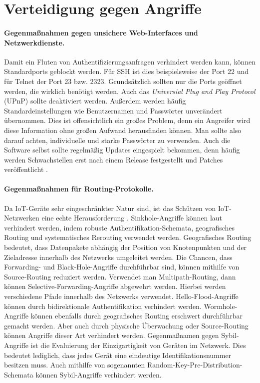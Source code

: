 \section{Verteidigung gegen Angriffe}

\paragraph{Gegenmaßnahmen gegen unsichere Web-Interfaces und Netzwerkdienste.}
Damit ein Fluten von Authentifizierungsanfragen verhindert werden kann, können
Standardports geblockt werden. Für SSH ist dies beispielsweise der Port 22 und
für Telnet der Port 23 bzw. 2323. Grundsätzlich sollten nur die Ports
geöffnet werden, die wirklich benötigt werden. Auch das \textit{Universial Plug
and Play Protocol} (UPnP) sollte deaktiviert werden. Außerdem werden häufig
Standardeinstellungen wie Benutzernamen und Passwörter unverändert übernommen.
Dies ist offensichtlich ein großes Problem, denn ein Angreifer wird diese
Information ohne großen Aufwand herausfinden können. Man sollte also darauf
achten, individuelle und starke Passwörter zu verwenden. Auch die Software
selbst sollte regelmäßig Updates eingespielt bekommen, denn häufig werden
Schwachstellen erst nach einem Release festgestellt und Patches
veröffentlicht \cite{paper}.

\paragraph{Gegenmaßnahmen für Routing-Protokolle.}
Da IoT-Geräte sehr eingeschränkter Natur sind, ist das Schützen von
IoT-Netzwerken eine echte Herausforderung \cite{patel2016}. Sinkhole-Angriffe
können laut \cite{paper} verhindert werden, indem robuste
Authentifikation-Schemata, geografisches Routing und systematisches Rerouting
verwendet werden.  Geografisches Routing bedeutet, dass Datenpakete abhängig der
Position von Knotenpunkten und der Zieladresse innerhalb des Netzwerks
umgeleitet werden.  Die Chancen, dass Forwarding- und Black-Hole-Angriffe
durchführbar sind, können mithilfe von Source-Routing reduziert werden.
Verwendet man Multipath-Routing, dann können Selective-Forwarding-Angriffe
abgewehrt werden. Hierbei werden verschiedene Pfade innerhalb des Netzwerks
verwendet. Hello-Flood-Angriffe können durch bidirektionale Authentifikation
verhindert werden.  Wormhole-Angriffe können ebenfalls durch geografisches
Routing erschwert durchführbar gemacht werden. Aber auch durch physische
Überwachung oder Source-Rou\-ting können Angriffe dieser Art verhindert werden.
Gegenmaßnamen gegen Sybil-Angriffe ist die Evaluierung der Einzigartigkeit von
Geräten im Netzwerk.  Dies bedeutet lediglich, dass jedes Gerät eine eindeutige
Identifikationsnummer besitzen muss. Auch mithilfe von sogenannten
Random-Key-Pre-Dis\-tri\-bu\-tion-Schemata \cite{chan2003} können Sybil-Angriffe
verhindert werden.

